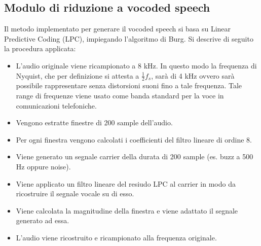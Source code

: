 			\subsection{Modulo di riduzione a vocoded speech}
			Il metodo implementato per generare il vocoded speech si basa su Linear Predictive Coding (LPC), impiegando l'algoritmo di Burg\cite{burg-algorithm}.
			Si descrive di seguito la procedura applicata:
			\begin{itemize}
				\item L'audio originale viene ricampionato a 8 kHz. In questo modo la frequenza di Nyquist, che per definizione si attesta a $ \frac{1}{2} f_{s} $, sarà di 4 kHz ovvero sarà possibile rappresentare senza distorsioni suoni fino a tale frequenza. Tale range di frequenze viene usato come banda standard per la voce in comunicazioni telefoniche. 
				\item Vengono estratte finestre di 200 sample dell'audio.
				\item Per ogni finestra vengono calcolati i coefficienti del filtro lineare di ordine 8.
				\item Viene generato un segnale carrier della durata di 200 sample (es. buzz a 500 Hz oppure noise).
				\item Viene applicato un filtro lineare del resiudo LPC al carrier in modo da ricostruire il segnale vocale su di esso.
				\item Viene calcolata la magnitudine della finestra e viene adattato il segnale generato ad essa.
				\item L'audio viene ricostruito e ricampionato alla frequenza originale.
			\end{itemize}
		
